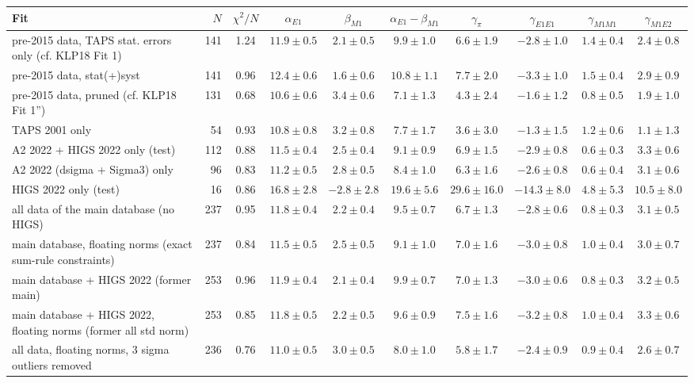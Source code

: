 \begin{tabular}{l r c cccc ccc}
\hline
Fit & $N$ & $\chi^2/N$ & $\alpha_{E1}$ & $\beta_{M1}$ & $\alpha_{E1}-\beta_{M1}$ & $\gamma_\pi$ & $\gamma_{E1E1}$ & $\gamma_{M1M1}$ & $\gamma_{M1E2}$\\\hline
pre-2015 data, TAPS stat. errors only (cf. KLP18 Fit 1) & 141 & 1.24 & $11.9\pm0.5$ & $2.1\pm0.5$ & $9.9\pm1.0$ & $6.6\pm1.9$ & $-2.8\pm1.0$ & $1.4\pm0.4$ & $2.4\pm0.8$\\
pre-2015 data, stat(+)syst & 141 & 0.96 & $12.4\pm0.6$ & $1.6\pm0.6$ & $10.8\pm1.1$ & $7.7\pm2.0$ & $-3.3\pm1.0$ & $1.5\pm0.4$ & $2.9\pm0.9$\\
pre-2015 data, pruned (cf. KLP18 Fit 1'') & 131 & 0.68 & $10.6\pm0.6$ & $3.4\pm0.6$ & $7.1\pm1.3$ & $4.3\pm2.4$ & $-1.6\pm1.2$ & $0.8\pm0.5$ & $1.9\pm1.0$\\
TAPS 2001 only & 54 & 0.93 & $10.8\pm0.8$ & $3.2\pm0.8$ & $7.7\pm1.7$ & $3.6\pm3.0$ & $-1.3\pm1.5$ & $1.2\pm0.6$ & $1.1\pm1.3$\\
A2 2022 + HIGS 2022 only (test) & 112 & 0.88 & $11.5\pm0.4$ & $2.5\pm0.4$ & $9.1\pm0.9$ & $6.9\pm1.5$ & $-2.9\pm0.8$ & $0.6\pm0.3$ & $3.3\pm0.6$\\
A2 2022 (dsigma + Sigma3) only & 96 & 0.83 & $11.2\pm0.5$ & $2.8\pm0.5$ & $8.4\pm1.0$ & $6.3\pm1.6$ & $-2.6\pm0.8$ & $0.6\pm0.4$ & $3.1\pm0.6$\\
HIGS 2022 only (test) & 16 & 0.86 & $16.8\pm2.8$ & $-2.8\pm2.8$ & $19.6\pm5.6$ & $29.6\pm16.0$ & $-14.3\pm8.0$ & $4.8\pm5.3$ & $10.5\pm8.0$\\
all data of the main database (no HIGS) & 237 & 0.95 & $11.8\pm0.4$ & $2.2\pm0.4$ & $9.5\pm0.7$ & $6.7\pm1.3$ & $-2.8\pm0.6$ & $0.8\pm0.3$ & $3.1\pm0.5$\\
main database, floating norms (exact sum-rule constraints) & 237 & 0.84 & $11.5\pm0.5$ & $2.5\pm0.5$ & $9.1\pm1.0$ & $7.0\pm1.6$ & $-3.0\pm0.8$ & $1.0\pm0.4$ & $3.0\pm0.7$\\
main database + HIGS 2022 (former main) & 253 & 0.96 & $11.9\pm0.4$ & $2.1\pm0.4$ & $9.9\pm0.7$ & $7.0\pm1.3$ & $-3.0\pm0.6$ & $0.8\pm0.3$ & $3.2\pm0.5$\\
main database + HIGS 2022, floating norms (former all std norm) & 253 & 0.85 & $11.8\pm0.5$ & $2.2\pm0.5$ & $9.6\pm0.9$ & $7.5\pm1.6$ & $-3.2\pm0.8$ & $1.0\pm0.4$ & $3.3\pm0.6$\\
all data, floating norms, 3 sigma outliers removed & 236 & 0.76 & $11.0\pm0.5$ & $3.0\pm0.5$ & $8.0\pm1.0$ & $5.8\pm1.7$ & $-2.4\pm0.9$ & $0.9\pm0.4$ & $2.6\pm0.7$\\

\end{tabular}
